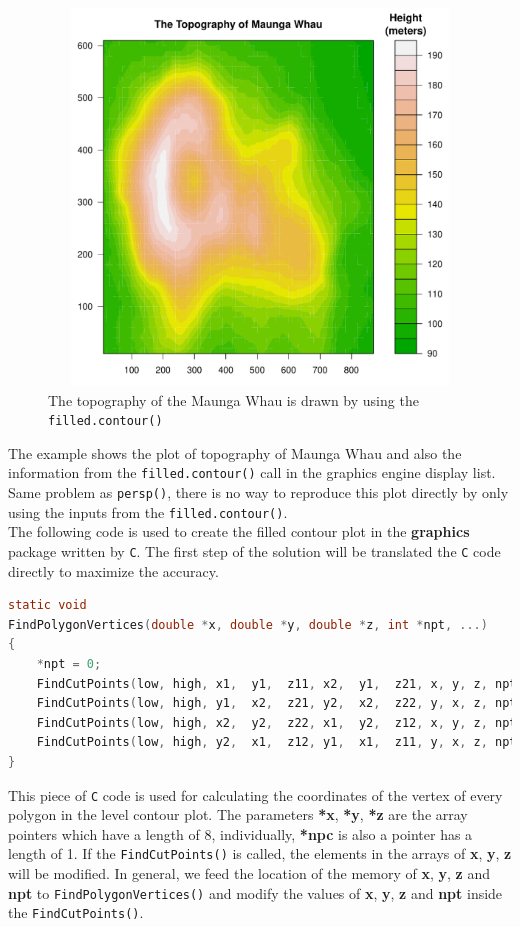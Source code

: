 \documentclass[11pt,twoside]{report}
\begin{document}
\begin{figure}[h]
	\begin{center}
		\includegraphics[height = 10cm, width = 12cm]{figure/filled_example_1.pdf}
		\caption{The topography of the Maunga Whau is drawn by using the \texttt{filled.contour()}}
		\label{figure_3.6}
	\end{center}
\end{figure}

The example shows the plot of topography of Maunga Whau and also the information from the \texttt{filled.contour()} call in the graphics engine display list. Same problem as \texttt{persp()}, there is no way to reproduce this plot directly by only using the inputs from the \texttt{filled.contour()}.\\

The following code is used to create the filled contour plot in the \textbf{graphics} package written by \texttt{C}. The first step of the solution will be translated the \texttt{C} code directly to maximize the accuracy.\\

\begin{lstlisting}[language = C]
static void
FindPolygonVertices(double *x, double *y, double *z, int *npt, ...)
{
    *npt = 0;
    FindCutPoints(low, high, x1,  y1,  z11, x2,  y1,  z21, x, y, z, npt);
    FindCutPoints(low, high, y1,  x2,  z21, y2,  x2,  z22, y, x, z, npt);
    FindCutPoints(low, high, x2,  y2,  z22, x1,  y2,  z12, x, y, z, npt);
    FindCutPoints(low, high, y2,  x1,  z12, y1,  x1,  z11, y, x, z, npt);
}
\end{lstlisting}
This piece of \texttt{C} code is used for calculating the coordinates of the vertex of every polygon in the level contour plot. The parameters \textbf{*x}, \textbf{*y}, \textbf{*z} are the array pointers which have a length of 8, individually, \textbf{*npc} is also a pointer has a length of 1. If the \texttt{FindCutPoints()} is called, the elements in the arrays of \textbf{x}, \textbf{y}, \textbf{z} will be modified. In general, we feed the location of the memory of \textbf{x}, \textbf{y}, \textbf{z} and \textbf{npt} to \texttt{FindPolygonVertices()} and modify the values of \textbf{x}, \textbf{y}, \textbf{z} and \textbf{npt} inside the \texttt{FindCutPoints()}.\\
\end{document}
